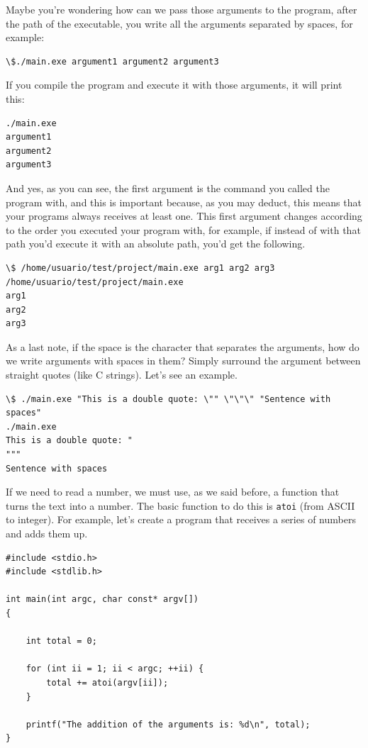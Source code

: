 \documentclass[a4paper]{article}
\begin{document}
Maybe you're wondering how can we pass those arguments to the program, after the
path of the executable, you write all the arguments separated by spaces, for
example:
\begin{lstlisting}[style=terminalStyle]
\$./main.exe argument1 argument2 argument3
\end{lstlisting}
If you compile the program and execute it with those arguments, it will print
this:

\begin{lstlisting}[style=terminalStyle]
./main.exe
argument1
argument2
argument3
\end{lstlisting}

And yes, as you can see, the first argument is the command you called the
program with, and this is important because, as you may deduct, this means
that your programs always receives at least one. This first argument changes
according to the order you executed your program with, for example, if instead
of with that path you'd execute it with an absolute path, you'd get the
following.

\begin{lstlisting}[style=terminalStyle]
\$ /home/usuario/test/project/main.exe arg1 arg2 arg3
/home/usuario/test/project/main.exe
arg1
arg2
arg3
\end{lstlisting}

As a last note, if the space is the character that separates the arguments, how
do we write arguments with spaces in them? Simply surround the argument between
straight quotes (like C strings). Let's see an example.
\begin{lstlisting}[style=terminalStyle]
\$ ./main.exe "This is a double quote: \"" \"\"\" "Sentence with spaces"
./main.exe
This is a double quote: "
"""
Sentence with spaces
\end{lstlisting}

If we need to read a number, we must use, as we said before, a function that
turns the text into a number. The basic function to do this is \verb!atoi!
(from ASCII to integer). For example, let's create a program that receives a
series of numbers and adds them up.

\noindent
\begin{minipage}[H]{\linewidth}
\mbox{}
\begin{lstlisting}[style=C,
caption={Program that adds its arguments},
label={lst:sumArgs}]
#include <stdio.h>
#include <stdlib.h>

int main(int argc, char const* argv[])
{

    int total = 0;

    for (int ii = 1; ii < argc; ++ii) {
        total += atoi(argv[ii]);
    }

    printf("The addition of the arguments is: %d\n", total);
}
\end{lstlisting}
\end{minipage}
\end{document}
